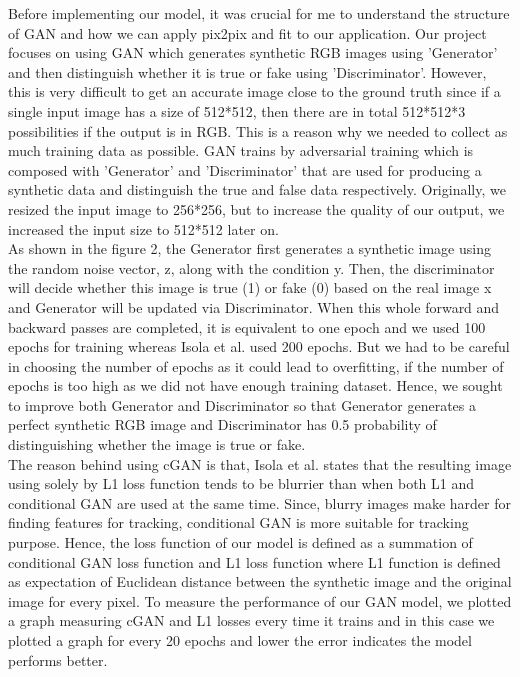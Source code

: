 \documentclass[conference]{IEEEtran}
\begin{document}
Before implementing our model, it was crucial for me to understand the structure of GAN and how we can apply pix2pix and fit to our application. Our project focuses on using GAN which generates synthetic RGB images using ’Generator’ and then distinguish whether it is true or fake using ’Discriminator’. However, this is very difficult to get an accurate image close to the ground truth since if a single input image has a size of 512*512, then there are in total 512*512*3 possibilities if the output is in RGB. This is a reason why we needed to collect as much training data as possible. GAN trains by adversarial training which is composed with ’Generator’ and ’Discriminator’ that are used for producing a synthetic data and distinguish the true and false data respectively. Originally, we resized the input image to 256*256, but to increase the quality of our output, we increased the input size to 512*512 later on.\\
As shown in the figure 2, the Generator first generates a synthetic image using the random noise vector, z, along with the condition y. Then, the discriminator will decide whether this image is true (1) or fake (0) based on the real image x and Generator will be updated via Discriminator. When this whole forward and backward passes are completed, it is equivalent to one epoch and we used 100 epochs for training whereas Isola et al. \cite{b1} used 200 epochs. But we had to be careful in choosing the number of epochs as it could lead to overfitting, if the number of epochs is too high as we did not have enough training dataset. Hence, we sought to improve both Generator and Discriminator so that Generator generates a perfect synthetic RGB image and Discriminator has 0.5 probability of distinguishing whether the image is true or fake.\\

The reason behind using cGAN is that, Isola et al. \cite{b1} states that the resulting image using solely by L1 loss function tends to be blurrier than when both L1 and conditional GAN are used at the same time. Since, blurry images make harder for finding features for tracking, conditional GAN is more suitable for tracking purpose. Hence, the loss function of our model is defined as a summation of conditional GAN loss function and L1 loss function where L1 function is defined as expectation of Euclidean distance between the synthetic image and the original image for every pixel. To measure the performance of our GAN model, we plotted a graph measuring cGAN and L1 losses every time it trains and in this case we plotted a graph for every 20 epochs and lower the error indicates the model performs better. \\
\end{document}
